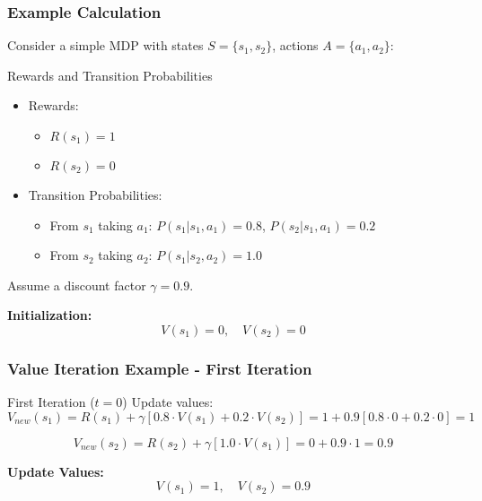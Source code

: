 \documentclass[aspectratio=169]{beamer}
\begin{document}
\begin{frame}[fragile]
    \frametitle{Example Calculation}

    Consider a simple MDP with states $S = \{s_1, s_2\}$, actions $A = \{a_1, a_2\}$:
    
    \begin{block}{Rewards and Transition Probabilities}
        \begin{itemize}
            \item Rewards:
                \begin{itemize}
                    \item $R(s_1) = 1$
                    \item $R(s_2) = 0$
                \end{itemize}
            \item Transition Probabilities:
                \begin{itemize}
                    \item From $s_1$ taking $a_1$: $P(s_1 | s_1, a_1) = 0.8$, $P(s_2 | s_1, a_1) = 0.2$
                    \item From $s_2$ taking $a_2$: $P(s_1 | s_2, a_2) = 1.0$
                \end{itemize}
        \end{itemize}
    \end{block}
    
    Assume a discount factor $\gamma = 0.9$.

    \textbf{Initialization:}
    \[
    V(s_1) = 0, \quad V(s_2) = 0
    \]
    
\end{frame}

\begin{frame}[fragile]
    \frametitle{Value Iteration Example - First Iteration}

    \begin{block}{First Iteration ($t=0$)}
        Update values:
        \[
        V_{new}(s_1) = R(s_1) + \gamma [0.8 \cdot V(s_1) + 0.2 \cdot V(s_2)] = 1 + 0.9[0.8 \cdot 0 + 0.2 \cdot 0] = 1
        \]
        
        \[
        V_{new}(s_2) = R(s_2) + \gamma [1.0 \cdot V(s_1)] = 0 + 0.9 \cdot 1 = 0.9
        \]
        
        \textbf{Update Values:}
        \[
        V(s_1) = 1, \quad V(s_2) = 0.9
        \]
    \end{block}
\end{frame}
\end{document}

